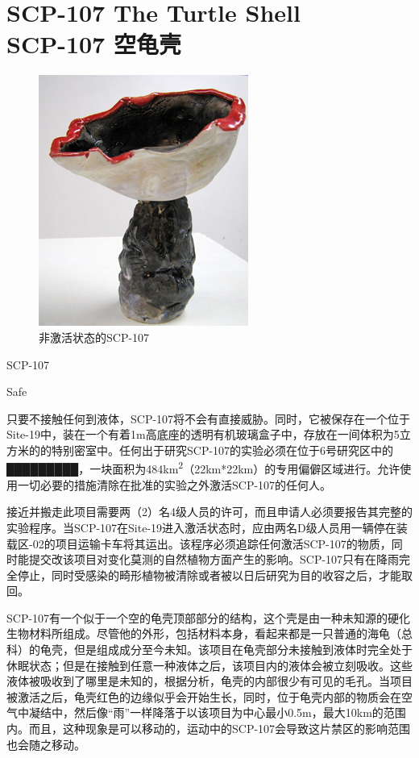 \chapter[SCP-107 空龟壳]{
    SCP-107 The Turtle Shell\\
    SCP-107 空龟壳
}

\label{chap:SCP-107}

\begin{figure}[H]
    \centering
    \includegraphics[width=0.5\linewidth]{images/SCP-107.jpg}
    \caption*{非激活状态的SCP-107}
\end{figure}

SCP-107

Safe

只要不接触任何到液体，SCP-107将不会有直接威胁。同时，它被保存在一个位于Site-19中，装在一个有着1m高底座的透明有机玻璃盒子中，存放在一间体积为5立方米的的特别密室中。任何出于研究SCP-107的实验必须在位于6号研究区中的█████████，一块面积为484km\textsuperscript{2}（22km*22km）的专用偏僻区域进行。允许使用一切必要的措施清除在批准的实验之外激活SCP-107的任何人。

接近并搬走此项目需要两（2）名4级人员的许可，而且申请人必须要报告其完整的实验程序。当SCP-107在Site-19进入激活状态时，应由两名D级人员用一辆停在装载区-02的项目运输卡车将其运出。该程序必须追踪任何激活SCP-107的物质，同时能提交改该项目对变化莫测的自然植物方面产生的影响。SCP-107只有在降雨完全停止，同时受感染的畸形植物被清除或者被以日后研究为目的收容之后，才能取回。

SCP-107有一个似于一个空的龟壳顶部部分的结构，这个壳是由一种未知源的硬化生物材料所组成。尽管他的外形，包括材料本身，看起来都是一只普通的海龟（总科）的龟壳，但是组成成分至今未知。该项目在龟壳部分未接触到液体时完全处于休眠状态；但是在接触到任意一种液体之后，该项目内的液体会被立刻吸收。这些液体被吸收到了哪里是未知的，根据分析，龟壳的内部很少有可见的毛孔。当项目被激活之后，龟壳红色的边缘似乎会开始生长，同时，位于龟壳内部的物质会在空气中凝结中，然后像“雨”一样降落于以该项目为中心最小0.5m，最大10km的范围内。而且，这种现象是可以移动的，运动中的SCP-107会导致这片禁区的影响范围也会随之移动。

